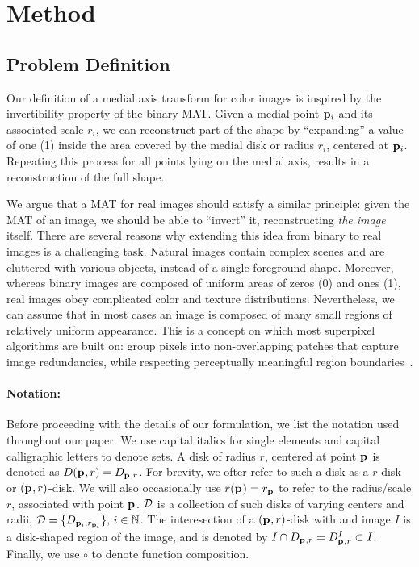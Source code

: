 \documentclass[10pt,twocolumn,letterpaper]{article}
\begin{document}
\section{Method}\label{sec:method}
\subsection{Problem Definition}\label{sec:definition}
Our definition of a medial axis transform for color images is inspired by the invertibility property of the binary MAT. 
Given a medial point $\mathbf{p}_{i}$ and its associated scale $r_i$, we can reconstruct part of the shape by 
``expanding'' a value of one (1) inside the area covered by the medial disk or radius $r_i$, centered at $\mathbf{p}_{i}$.
Repeating this process for all points lying on the medial axis, results in a reconstruction of the full shape.

We argue that a MAT for real images should satisfy a similar principle: given the MAT of an image, 
we should be able to ``invert'' it, reconstructing \emph{the image} itself.
There are several reasons why extending this idea from binary to real images is a challenging task. 
Natural images contain complex scenes and are cluttered with various objects, instead of a single foreground shape. 
Moreover, whereas binary images are composed of uniform areas of zeros (0) and ones (1), 
real images obey complicated color and texture distributions. 
Nevertheless, we can assume that in most cases an image is composed of many small regions of relatively uniform appearance. 
This is a concept on which most superpixel algorithms are built on: group pixels 
into non-overlapping patches that capture image redundancies, while respecting perceptually meaningful region boundaries~\cite{shi2000normalized,levinshtein2009turbopixels,achanta2012slic}. 

\paragraph{Notation:} Before proceeding with the details of our formulation, we list the notation used throughout our paper.
We use capital italics for single elements and capital calligraphic letters to denote sets. A disk of radius $r$,
centered at point $\mathbf{p}_{}$ is denoted as $D(\mathbf{p}_{},r)=D_{\mathbf{p}_{},r}$. 
For brevity, we ofter refer to such a disk as a $r$-disk or $(\mathbf{p}_{},r)$-disk.
We will also occasionally use $r(\mathbf{p}_{}) = r_{\mathbf{p}_{}}$ to refer to the radius/scale $r$, associated with point $\mathbf{p}_{}$.
$\mathcal{D}$ is a collection of such disks of varying centers and radii, $\mathcal{D}=\{ D_{\mathbf{p}_{i},r_{\mathbf{p}_{i}}} \},\, i\in\mathbb{N}$.
The interesection of a $(\mathbf{p}_{},r)$-disk with and image $I$ is a disk-shaped region of the image, and is denoted by 
$I \cap D_{\mathbf{p}_{},r}=D_{\mathbf{p}_{},r}^I \subset I$. Finally, we use $\circ$ to denote function composition.
\end{document}
